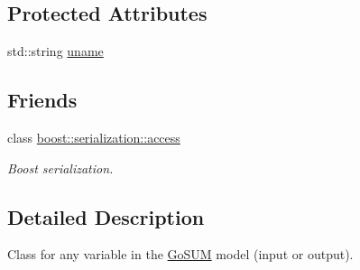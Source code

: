 \subsection*{Protected Attributes}
\begin{DoxyCompactItemize}
\item 
std\-::string \hyperlink{class_go_s_u_m_1_1_c_model_variable_ae7476c53db1987e31c50ac89b88f5402}{uname}
\end{DoxyCompactItemize}
\subsection*{Friends}
\begin{DoxyCompactItemize}
\item 
class \hyperlink{class_go_s_u_m_1_1_c_model_variable_ac98d07dd8f7b70e16ccb9a01abf56b9c}{boost\-::serialization\-::access}
\begin{DoxyCompactList}\small\item\em Boost serialization. \end{DoxyCompactList}\end{DoxyCompactItemize}


\subsection{Detailed Description}
Class for any variable in the \hyperlink{struct_go_s_u_m}{Go\-S\-U\-M} model (input or output). 

